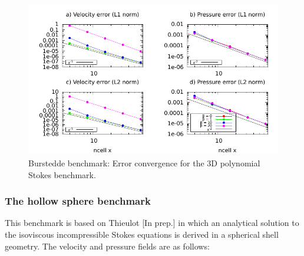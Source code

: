 \documentclass{article}
\begin{document}
\begin{figure}[tbp]
  \centering
  \includegraphics[width=\textwidth]{cookbooks/benchmarks/burstedde/errors.pdf}
  \caption{Burstedde benchmark: Error convergence for the 3D polynomial Stokes
    benchmark.
    \label{errors}}
\end{figure}


\subsubsection{The hollow sphere benchmark}

\label{sec:cookbooks-hollow-sphere}

This benchmark is based on Thieulot [In prep.] in which an analytical solution to the
isoviscous incompressible Stokes equations is derived in a spherical shell geometry.
The velocity and pressure fields are as follows:
\end{document}
